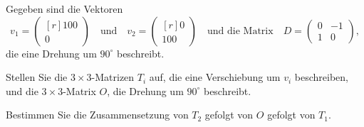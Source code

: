 Gegeben sind die Vektoren
\[
v_1
=
\begin{pmatrix*}[r]
100\\
0
\end{pmatrix*}
\quad\text{und}\quad
v_2
=
\begin{pmatrix*}[r]
0\\
100
\end{pmatrix*}
\quad\text{und die Matrix}\quad
D
=
\begin{pmatrix}
0 & -1 \\
1 &  0
\end{pmatrix},
\]
die eine Drehung um $90^\circ$ beschreibt.
\begin{teilaufgaben}
\item
Stellen Sie die $3\times 3$-Matrizen $T_i$ auf, die eine Verschiebung
um $v_i$ beschreiben, und die $3\times 3$-Matrix $O$, die Drehung um
$90^\circ$ beschreibt.
\item
Bestimmen Sie die Zusammensetzung von $T_2$ gefolgt von $O$ gefolgt
von $T_1$.
\end{teilaufgaben}

